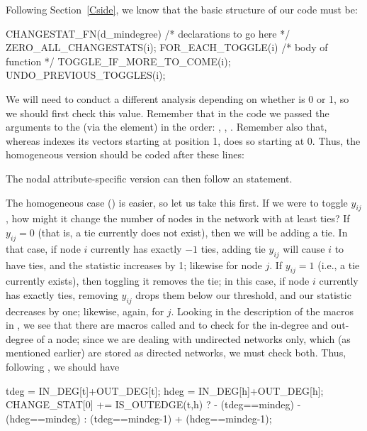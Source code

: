 \documentclass[nojss]{jss}
\begin{document}
Following Section~\ref{Cside}, we know that the basic structure of our
 code must be:
\begin{CodeChunk}
\begin{CodeInput}
CHANGESTAT_FN(d_mindegree) {
  /* declarations to go here */
  ZERO_ALL_CHANGESTATS(i);
  FOR_EACH_TOGGLE(i) {
    /* body of function */
    TOGGLE_IF_MORE_TO_COME(i);
  }
  UNDO_PREVIOUS_TOGGLES(i);
}
\end{CodeInput}
\end{CodeChunk}

We will need to conduct a different analysis depending on whether
 is 0 or 1, so we should first check this value. Remember that in
the  code we passed the arguments to the  (via the
 element) in the order: , ,
.
Remember also that, whereas
 indexes its vectors starting at position 1,  does so
starting at 0.  Thus, the homogeneous version should be coded after these lines:
\begin{CodeChunk}
\begin{CodeInput}
  attrflag = INPUT_PARAM[0];
  mindeg = INPUT_PARAM[1];
  if(attrflag==0){
\end{CodeInput}
\end{CodeChunk}
The nodal attribute-specific version can then follow an  statement.

The homogeneous case () is easier, so let us take this first.
If we were to toggle $y_{ij}$, how might it change the number of nodes in the
network with at least  ties? If $y_{ij}=0$ (that is, a tie
currently does not exist), then we will be adding a tie. In that case, if node
$i$ currently has exactly $-1$ ties, adding tie $y_{ij}$ will cause
$i$ to have  ties, and the statistic increases by 1; likewise for
node $j$. If $y_{ij}=1$ (i.e., a tie currently exists), then toggling it removes
the tie; in this case, if node $i$ currently has exactly  ties,
removing $y_{ij}$ drops them below our threshold, and our statistic decreases by
one; likewise, again, for $j$. Looking in the description of the macros in
, we see that there are macros called  and
 to check for the in-degree and out-degree of a node; since we are
dealing with undirected networks only, which (as mentioned earlier) are stored
as directed networks, we must check both. 
Thus, following 
, we should have
\begin{CodeChunk}
\begin{CodeInput}
      tdeg = IN_DEG[t]+OUT_DEG[t];
      hdeg = IN_DEG[h]+OUT_DEG[h];
      CHANGE_STAT[0] += IS_OUTEDGE(t,h) ?
        - (tdeg==mindeg) - (hdeg==mindeg) :
        (tdeg==mindeg-1) + (hdeg==mindeg-1);
\end{CodeInput}
\end{CodeChunk}
\end{document}

